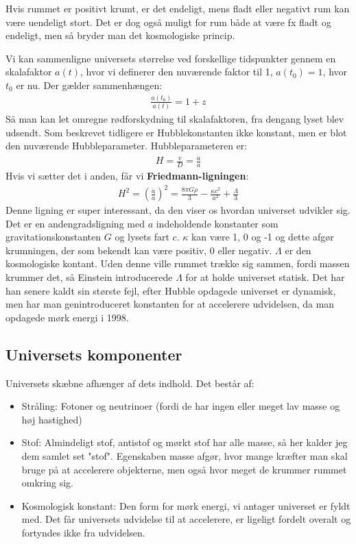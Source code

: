 \documentclass[a4paper]{article}
\begin{document}
Hvis rummet er positivt krumt, er det endeligt, mens fladt eller negativt rum kan være uendeligt stort. Det er dog også muligt for rum både at være fx fladt og endeligt, men så bryder man det kosmologiske princip.

Vi kan sammenligne universets størrelse ved forskellige tidspunkter gennem en skalafaktor $a(t)$, hvor vi definerer den nuværende faktor til 1, $a(t_0)=1$, hvor $t_0$ er nu. Der gælder sammenhængen:
\begin{align}
	\frac{a(t_0)}{a(t)}=1+z
\end{align}
Så man kan let omregne rødforskydning til skalafaktoren, fra dengang lyset blev udsendt. Som beskrevet%
 tidligere er Hubblekonstanten ikke konstant, men er blot den nuværende Hubbleparameter. Hubbleparameteren er:
 \begin{align}
 H=\frac{v}{D}=\frac{\dot{a}}{a}
 \end{align}
 Hvis vi sætter det i anden, får vi \textbf{Friedmann-ligningen}:
\begin{align}
	H^2=\left(\frac{\dot{a}}{a}\right)^2=\frac{8\pi G \rho}{3}-\frac{\kappa c^2}{a^2}+\frac{\Lambda}{3}
\end{align}
Denne ligning er super interessant, da den viser os hvordan universet udvikler sig. Det er en andengradsligning med $a$ indeholdende konstanter som gravitationskonstanten $G$ og lysets fart $c$. $\kappa$ kan være 1, 0 og -1 og dette afgør krumningen, der som bekendt kan være positiv, 0 eller negativ. $\Lambda$ er den kosmologiske kontant. Uden denne ville rummet trække sig sammen, fordi massen krummer det, så Einstein introducerede $\Lambda$ for at holde universet statisk. Det har han senere kaldt sin største fejl, efter Hubble opdagede universet er dynamisk, men har man genintroduceret konstanten for at accelerere udvidelsen, da man opdagede mørk energi i 1998. 


\subsection{Universets komponenter} \label{bestanddele}
Universets skæbne afhænger af dets indhold. Det består af:
\begin{itemize}
	\item Stråling: Fotoner og neutrinoer (fordi de har ingen eller meget lav masse og høj hastighed)
	\item Stof: Almindeligt stof, antistof og mørkt stof har alle masse, så her kalder jeg dem samlet set "stof". Egenskaben masse afgør, hvor mange kræfter man skal bruge på at accelerere objekterne, men også hvor meget de krummer rummet omkring sig.
	\item Kosmologisk konstant: Den form for mørk energi, vi antager universet er fyldt med. Det får universets udvidelse til at accelerere, er ligeligt fordelt overalt og fortyndes ikke fra udvidelsen.
\end{itemize}
\end{document}
